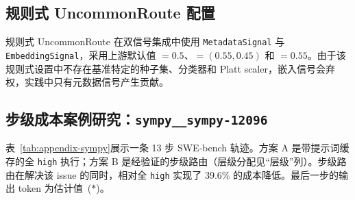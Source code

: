 \subsection{规则式 UncommonRoute 配置}
\label{app:ur-config}

规则式 UncommonRoute 在双信号集成中使用 \texttt{MetadataSignal} 与 \texttt{EmbeddingSignal}，采用上游默认值 $=0.5$、$=(0.55,0.45)$ 和 $=0.55$。由于该规则式设置中不存在基准特定的种子集、分类器和 Platt scaler，嵌入信号会弃权，实践中只有元数据信号产生贡献。

\subsection{步级成本案例研究：\texttt{sympy\_\_sympy-12096}}
\label{app:sympy}

表~\ref{tab:appendix-sympy}展示一条 13 步 SWE-bench 轨迹。方案 A 是带提示词缓存的全 \texttt{high} 执行；方案 B 是经验证的步级路由（层级分配见“层级”列）。步级路由在解决该 issue 的同时，相对全 \texttt{high} 实现了 39.6\% 的成本降低。最后一步的输出 token 为估计值~($*$)。

